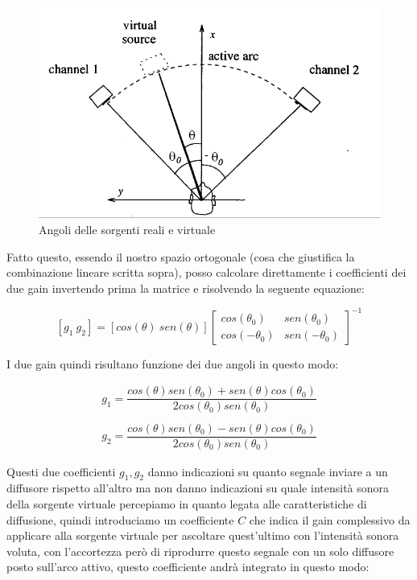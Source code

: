 \documentclass[12pt,a4paper]{report}
\begin{document}
\begin{figure}[htbp]
	\centering
	\includegraphics[scale=0.45]{figures/angoli.png}
	\caption {Angoli delle sorgenti reali e virtuale}
	\label{fig:angoli}
	\end{figure}

Fatto questo, essendo il nostro spazio ortogonale (cosa che giustifica la combinazione lineare scritta sopra), posso calcolare direttamente i coefficienti dei due gain invertendo prima la matrice e risolvendo la seguente equazione: 

\begin{equation}
\left[g_1 \ g_2\right] = \left[ cos(\theta) \ sen(\theta) \right]  {\left[\begin{matrix}
cos(\theta_0) & sen(\theta_0)\\ cos(-\theta_0) & sen(-\theta_0)
\end{matrix} \right]}^{-1} 
\label{eq:trigonometricmatrix}
\end{equation}

I due gain quindi risultano funzione dei due angoli in questo modo:

\begin{equation}\begin{split}
g_1=\dfrac{cos(\theta) sen(\theta_0) + sen (\theta) cos(\theta_0)}{2 cos(\theta_0) sen(\theta_0)}\\ \\
g_2=\dfrac{cos(\theta) sen(\theta_0) - sen (\theta) cos(\theta_0)}{2 cos(\theta_0) sen(\theta_0)}
\end{split}
\label{eq:eeee}
\end{equation}

Questi due coefficienti $g_1, g_2$ danno indicazioni su quanto segnale inviare a un diffusore rispetto all'altro ma non danno indicazioni su quale intensità sonora della sorgente virtuale percepiamo in quanto legata alle caratteristiche di diffusione, quindi introduciamo un coefficiente $C$ che indica il gain complessivo da applicare alla sorgente virtuale per ascoltare quest'ultimo con l'intensità sonora voluta, con l'accortezza però di riprodurre questo segnale con un solo diffusore posto sull'arco attivo, questo coefficiente andrà integrato in questo modo:
\end{document}

